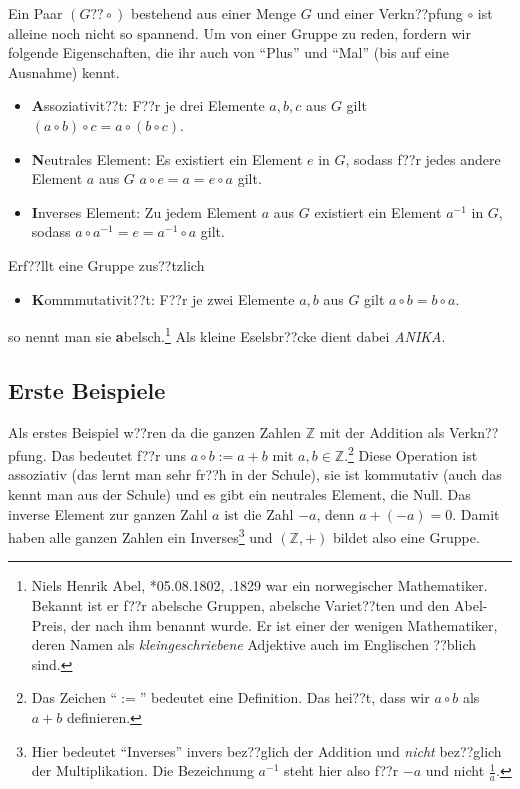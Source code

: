 \documentclass[a4paper,ngerman,12pt]{zirkelblatt1415}
\theoremstyle{definition}
\theoremstyle{plain}
\theoremstyle{remark}
\newcommand{\ZZ}{\mathbb{Z}}
\begin{document}
Ein Paar $(G??\circ )$ bestehend aus einer Menge $G$ und einer Verkn??pfung $\circ$ ist alleine noch nicht so spannend. Um von einer Gruppe zu reden, fordern wir folgende Eigenschaften, die ihr auch von "`Plus"' und "`Mal"' (bis auf eine Ausnahme) kennt.
\begin{itemize}
\item \textbf{A}ssoziativit??t: F??r je drei Elemente $a,b,c$ aus $G$ gilt $(a\circ b)\circ c = a\circ (b \circ c)$.
\item \textbf{N}eutrales Element: Es existiert ein Element $e$ in $G$, sodass f??r jedes andere Element $a$ aus $G$ $a\circ e = a = e\circ a$ gilt.
\item \textbf{I}nverses Element: Zu jedem Element $a$ aus $G$ existiert ein Element $a^{-1}$ in $G$, sodass $a\circ a^{-1} = e = a^{-1}\circ a$ gilt.
\end{itemize}
Erf??llt eine Gruppe zus??tzlich 
\begin{itemize}
\item \textbf{K}ommmutativit??t: F??r je zwei Elemente $a,b$ aus $G$ gilt $a\circ b = b\circ a$.
\end{itemize}
so nennt man sie \textbf{a}belsch.\footnote{Niels Henrik Abel, *05.08.1802, .1829 war ein norwegischer Mathematiker. Bekannt ist er f??r abelsche Gruppen, abelsche Variet??ten und den Abel-Preis, der nach ihm benannt wurde. Er ist einer der wenigen Mathematiker, deren Namen als \emph{kleingeschriebene} Adjektive auch im Englischen ??blich sind.} Als kleine Eselsbr??cke dient dabei \textit{ANIKA}.

\subsection{Erste Beispiele}

Als erstes Beispiel w??ren da die ganzen Zahlen $\ZZ$ mit der Addition als Verkn??pfung. Das bedeutet f??r uns $a\circ b:=a+b$ mit $a,b\in\ZZ$.\footnote{Das Zeichen "`$:=$"' bedeutet eine Definition. Das hei??t, dass wir $a\circ b$ als $a+b$ definieren.} Diese Operation ist assoziativ (das lernt man sehr fr??h in der Schule), sie ist kommutativ (auch das kennt man aus der Schule) und es gibt ein neutrales Element, die Null. Das inverse Element zur ganzen Zahl $a$ ist die Zahl $-a$, denn $a+(-a)=0$. Damit haben alle ganzen Zahlen ein Inverses\footnote{Hier bedeutet "`Inverses"' invers bez??glich der Addition und \emph{nicht} bez??glich der Multiplikation. Die Bezeichnung $a^{-1}$ steht hier also f??r $-a$ und nicht $\frac{1}{a}$.} und $(\ZZ,+)$ bildet also eine Gruppe. 
\end{document}
